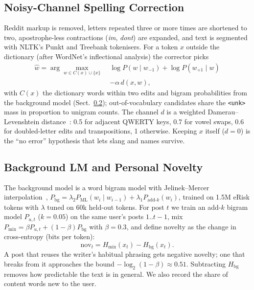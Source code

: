 \documentclass[conference]{IEEEtran}
\begin{document}
\subsection{Noisy-Channel Spelling Correction}
Reddit markup is removed, letters repeated three or more times are shortened to two, apostrophe-less contractions (\emph{im}, \emph{dont}) are expanded, and text is segmented with NLTK's Punkt and Treebank tokenisers. For a token $x$ outside the dictionary (after WordNet's inflectional analysis) the corrector picks
\begin{equation}
\begin{split}
\hat{w} = \arg\max_{w \in C(x) \cup \{x\}} \; & \log P(w \mid w_{-1}) + \log P(w_{+1} \mid w) \\
& - \alpha\, d(x, w),
\end{split}
\end{equation}
with $C(x)$ the dictionary words within two edits and bigram probabilities from the background model (Sect.~\ref{sec:lm}); out-of-vocabulary candidates share the \texttt{<unk>} mass in proportion to unigram counts. The channel $d$ is a weighted Damerau--Levenshtein distance~\cite{damerau1964technique,kernighan1990spelling}: 0.5 for adjacent QWERTY keys, 0.7 for vowel swaps, 0.6 for doubled-letter edits and transpositions, 1 otherwise. Keeping $x$ itself ($d=0$) is the ``no error'' hypothesis that lets slang and names survive.

\subsection{Background LM and Personal Novelty}
\label{sec:lm}
The background model is a word bigram model with Jelinek--Mercer interpolation~\cite{jelinek1980interpolated,chen1999empirical}, $P_{\text{bg}} = \lambda_2 P_{\text{ML}}(w_i \mid w_{i-1}) + \lambda_1 P_{\text{add-}k}(w_i)$, trained on 1.5M eRisk tokens with $\lambda$ tuned on 60k held-out tokens. For post $t$ we train an add-$k$ bigram model $P_{u,t}$ ($k=0.05$) on the same user's posts $1..t-1$, mix $P_{\text{mix}} = \beta P_{u,t} + (1-\beta) P_{\text{bg}}$ with $\beta = 0.3$, and define novelty as the change in cross-entropy (bits per token):
\begin{equation}
\mathrm{nov}_t = H_{\text{mix}}(x_t) - H_{\text{bg}}(x_t).
\end{equation}
A post that reuses the writer's habitual phrasing gets negative novelty; one that breaks from it approaches the bound $-\log_2(1-\beta) \approx 0.51$. Subtracting $H_{\text{bg}}$ removes how predictable the text is in general. We also record the share of content words new to the user.
\end{document}
